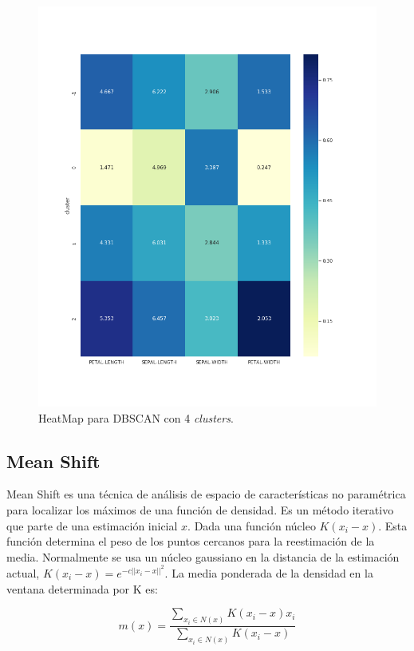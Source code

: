 \documentclass[a4paper, 20pt]{article}
\begin{document}
\begin{figure}[h]
\centering
\includegraphics[scale=0.62]{dani/heatmapDBSCANIRIS.png}
\caption{HeatMap para DBSCAN con 4 \textit{clusters}.}
\label{hmdb}
\end{figure}

\clearpage

\subsection{Mean Shift}

Mean Shift es una técnica de análisis de espacio de características no paramétrica para localizar los máximos de una función de densidad. Es un método iterativo que parte de una estimación inicial $x$. Dada una función núcleo $K(x_i-x)$. Esta función determina el peso de los puntos cercanos para la reestimación de la media. Normalmente se usa un núcleo gaussiano en la distancia de la estimación actual, $K(x_i-x)=e^{-c||x_i-x||^2}$. La media ponderada de la densidad en la ventana determinada por K es:

$$m(x)=\dfrac{\sum_{x_i\in N(x)}K(x_i-x)x_i}{\sum_{x_i\in N(x)}K(x_i-x)}$$
\end{document}

